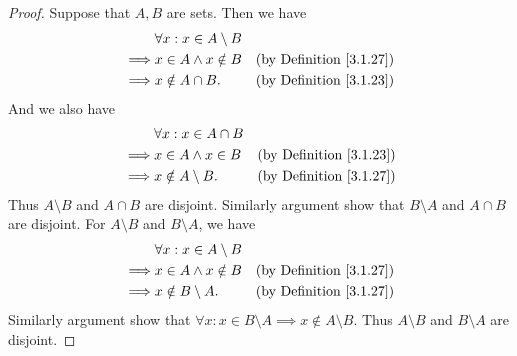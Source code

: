 \begin{proof}
    Suppose that \(A, B\) are sets.
    Then we have
    \begin{align*}
                 & \forall x : x \in A \setminus B                                       \\
        \implies & x \in A \land x \notin B        & \text{(by Definition \ref{3.1.27})} \\
        \implies & x \notin A \cap B.              & \text{(by Definition \ref{3.1.23})}
    \end{align*}
    And we also have
    \begin{align*}
                 & \forall x : x \in A \cap B                                       \\
        \implies & x \in A \land x \in B      & \text{(by Definition \ref{3.1.23})} \\
        \implies & x \notin A \setminus B.    & \text{(by Definition \ref{3.1.27})}
    \end{align*}
    Thus \(A \setminus B\) and \(A \cap B\) are disjoint.
    Similarly argument show that \(B \setminus A\) and \(A \cap B\) are disjoint.
    For \(A \setminus B\) and \(B \setminus A\), we have
    \begin{align*}
                 & \forall x : x \in A \setminus B                                       \\
        \implies & x \in A \land x \notin B        & \text{(by Definition \ref{3.1.27})} \\
        \implies & x \notin B \setminus A.         & \text{(by Definition \ref{3.1.27})}
    \end{align*}
    Similarly argument show that \(\forall x : x \in B \setminus A \implies x \notin A \setminus B\).
    Thus \(A \setminus B\) and \(B \setminus A\) are disjoint.


\end{proof}
